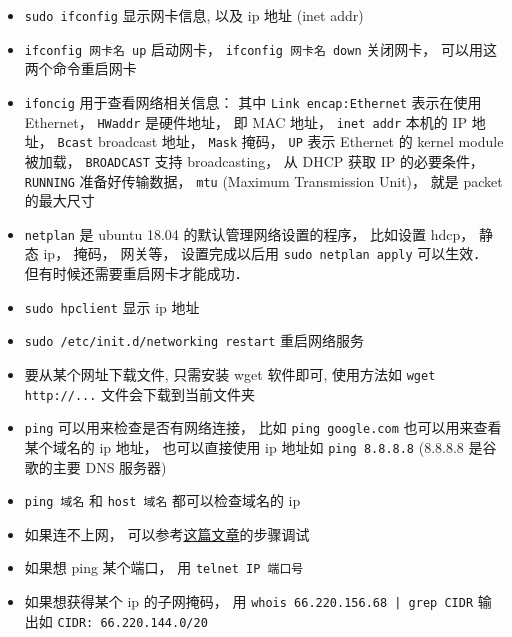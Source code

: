 
\begin{issues}
\issueDraft
\end{issues}

\begin{itemize}
\item \verb`sudo ifconfig` 显示网卡信息, 以及 ip 地址 (inet addr)
\item \verb`ifconfig 网卡名 up` 启动网卡， \verb`ifconfig 网卡名 down` 关闭网卡， 可以用这两个命令重启网卡
\item \verb`ifoncig` 用于查看网络相关信息： 其中 \verb`Link encap:Ethernet` 表示在使用 Ethernet， \verb`HWaddr` 是硬件地址， 即 MAC 地址， \verb`inet addr` 本机的 IP 地址， \verb`Bcast` broadcast 地址， \verb`Mask` 掩码， \verb`UP` 表示 Ethernet 的 kernel module 被加载， \verb`BROADCAST` 支持 broadcasting， 从 DHCP 获取 IP 的必要条件， \verb`RUNNING` 准备好传输数据， \verb`mtu` (Maximum Transmission Unit)， 就是 packet 的最大尺寸
\item \verb`netplan` 是 ubuntu 18.04 的默认管理网络设置的程序， 比如设置 hdcp， 静态 ip， 掩码， 网关等， 设置完成以后用 \verb`sudo netplan apply` 可以生效． 但有时候还需要重启网卡才能成功．
\item \verb`sudo hpclient` 显示 ip 地址
\item \verb`sudo /etc/init.d/networking restart` 重启网络服务 
\item 要从某个网址下载文件, 只需安装 wget 软件即可, 使用方法如 \verb`wget http://...` 文件会下载到当前文件夹
\item \verb`ping` 可以用来检查是否有网络连接， 比如 \verb`ping google.com` 也可以用来查看某个域名的 ip 地址， 也可以直接使用 ip 地址如 \verb`ping 8.8.8.8` (8.8.8.8 是谷歌的主要 DNS 服务器)
\item \verb`ping 域名` 和 \verb|host 域名| 都可以检查域名的 ip
\item 如果连不上网， 可以参考\href{https://upcloud.com/community/tutorials/troubleshoot-network-connectivity-linux-server/}{这篇文章}的步骤调试
\item 如果想 ping 某个端口， 用 \verb|telnet IP 端口号|
\item 如果想获得某个 ip 的子网掩码， 用 \verb`whois 66.220.156.68 | grep CIDR` 输出如 \verb|CIDR: 66.220.144.0/20|
\end{itemize}

